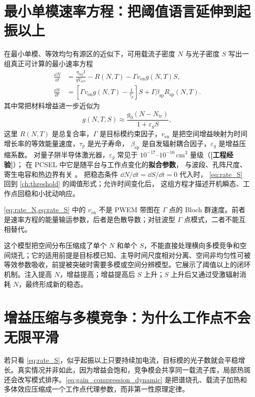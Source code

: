\section{最小单模速率方程：把阈值语言延伸到起振以上}
在最小单模、等效均匀有源区的近似下，可用载流子密度 $N$ 与光子密度 $S$ 写出一组真正可计算的最小速率方程
\begin{align}
\frac{\dd N}{\dd t}
&=
\frac{\eta_{\mathrm{inj}} I}{q V_{\mathrm{act}}}
- R(N,T)
  - \Gamma v_{\mathrm{en}} g(N,T) S,
\label{eq:rate_N}
\\
\frac{\dd S}{\dd t}
&=
  \left[\Gamma v_{\mathrm{en}} g(N,T)-\frac{1}{\tau_p}\right]S
+ \Gamma\beta_{\mathrm{sp}} R_{\mathrm{sp}}(N,T).
\label{eq:rate_S}
\end{align}
其中常把材料增益进一步近似为
\begin{equation}
g(N,T,S)
\approx
\frac{g_0\!\left(N-N_{\mathrm{tr}}\right)}{1+\varepsilon_g S},
\label{eq:gain_compression_dynamic}
\end{equation}
这里 $R(N,T)$ 是总复合率，$\Gamma$ 是目标模约束因子，$v_{\mathrm{en}}$
是把空间增益映射为时间增长率的等效能量速度，$\tau_p$ 是光子寿命，
$\beta_{\mathrm{sp}}$ 是自发辐射耦合因子，$\varepsilon_g$ 是增益压缩系数。
对量子阱半导体激光器，$\varepsilon_g$ 常见于 $10^{-17}$--$10^{-16}\,\mathrm{cm}^3$ 量级（\textbf{[工程经验]}）；
在 PCSEL 中它是随平台与工作点变化的\textbf{拟合参数}，
与波段、孔阵尺度、寄生电容和热边界有关
\cite{coldren2012,itoh2020,inoue2025fmpcsel}。
把稳态条件 $\dd N/\dd t=\dd S/\dd t=0$ 代入时，
\cref{eq:rate_S} 回到 \cref{ch:threshold} 的阈值形式；允许时间变化后，
这组方程才描述开机瞬态、工作点回稳和小扰动响应。

\cref{eq:rate_N,eq:rate_S} 中的 $v_{\mathrm{en}}$ 不是 PWEM 带图在 $\Gamma$ 点的 Bloch 群速度。前者是速率方程的能量输运参数，后者是色散导数；对驻波型 $\Gamma$ 点模式，二者不能互相替代。

这个模型把空间分布压缩成了单个 $N$ 和单个 $S$，不能直接处理横向多模竞争和空间烧孔；它的适用前提是目标模已知、主导时间尺度相对分离、空间非均匀性可被等效参数吸收，前提被突破时需要多模或空间分辨模型。它展示了阈值以上的闭环机制。注入提高 $N$，增益提高；增益提高后 $S$ 上升；$S$ 上升后又通过受激辐射消耗 $N$，最终形成新的稳态。

\section{增益压缩与多模竞争：为什么工作点不会无限平滑}
若只看 \cref{eq:rate_S}，似乎起振以上只要持续加电流，目标模的光子数就会平稳增长。真实情况并非如此，因为增益会饱和，竞争模会共享同一载流子库，局部热斑还会改写模式排序。\cref{eq:gain_compression_dynamic} 是把谱烧孔、载流子加热和多体效应压缩成一个工作点代理参数，而非第一性原理定律。

